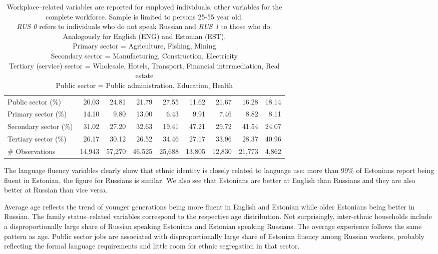 \documentclass[12pt, a4paper]{article}
\begin{document}
\begin{table}
\begin{tabular}{l|rrrr|rrrr}
		Public sector (\%)     & 20.03 & 24.81 & 21.79 & 27.55 & 11.62 & 21.67 & 16.28 & 18.14 \\
		Primary sector (\%)     & 14.10 & 9.80  & 13.00 & 6.43  & 9.91  & 7.46  & 8.82  & 8.11  \\
		Secondary sector (\%)    & 31.02 & 27.20 & 32.63 & 19.41 & 47.21 & 29.72 & 41.54 & 24.07 \\
		Tertiary sector (\%)    & 26.17 & 30.12 & 26.52 & 34.46 & 27.17 & 33.96 & 28.37 & 40.96 \\
		\# Observations       & 14,943 & 57,270 & 46,525 & 25,688 & 13,805 & 12,830 & 21,773 & 4,862 \\ \bottomrule
	\end{tabular}%
	\label{tab:descriptive}%
                             
                           
	\caption*{\small
				Workplace--related variables are reported for employed individuals,
			other variables for the complete workforce. Sample is limited to persons
			25-55 year old.\\
			\emph{RUS 0} refers to individuals who do not speak Russian and
			\emph{RUS 1} to those who do. Analogously for  
			English
			(ENG) and
			Estonian (EST).\\
			Primary sector = Agriculture,
			Fishing, Mining \\ Secondary sector = Manufacturing,
			Construction, Electricity \\ Tertiary (service) sector =
			Wholesale, Hotels, Transport, Financial intermediation, Real
			estate \\ Public sector = Public administration, Education,
			Health
		}
\end{table}%

The language fluency variables clearly show that ethnic identity is
closely related to language use: more than 99\% of Estonians report
being fluent in Estonian, the figure for Russians is similar. We
also see that Estonians are better at English than Russians and they
are also better at Russian than vice versa.

Average age reflects the trend of younger generations
being more fluent in English and Estonian while older Estonians being
better in Russian. The family status--related variables correspond to the
respective age distribution. Not surprisingly, inter-ethnic
households include a disproportionally large share of Russian speaking
Estonians and Estonian speaking Russians.
The average experience follows the same pattern as age.
Public sector jobs are associated with disproportionally large share of
Estonian fluency among Russian workers, probably reflecting the formal
language requirements and little room for ethnic segregation in that
sector.
\end{document}

